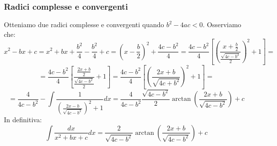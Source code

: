 \subsubsection{Radici complesse e convergenti}
Otteniamo due radici complesse e convergenti quando $b^2-4ac<0$. Osserviamo che:
\begin{equation*}x^2-bx+c = x^2+bx+\frac{b^2}{4}-\frac{b^2}{4}+c=(x-\frac{b}{2})^2+\frac{4c-b^2}{4}=\frac{4c-b^2}{4}[(\frac{x+\frac{b}{2}}{\frac{\sqrt{4c-b^2}}{2}})^2+1]=\end{equation*}
\begin{equation*}=\frac{4c-b^2}{4}[\frac{\frac{2x+b}{2}}{\frac{\sqrt{4c-b^2}}{2}}+1]=\frac{4c-b^2}{4}[(\frac{2x+b}{\sqrt{4c+b^2}})^2+1]=\end{equation*}
\begin{equation*}=\frac{4}{4c-b^2}-\int\frac{1}{(\frac{2x-b}{\sqrt{4c-b^2}})^2+1}dx=\frac{4}{4c-b^2}\frac{\sqrt{4c-b^2}}{2}\arctan(\frac{2x+b}{\sqrt{4c-b^2}})+c\end{equation*}
In definitiva:
\begin{equation*}
    \int\frac{dx}{x^2+bx+c}dx=\frac{2}{\sqrt{4c-b^2}}\arctan(\frac{2x+b}{\sqrt{4c-b^2}})+c
\end{equation*}


